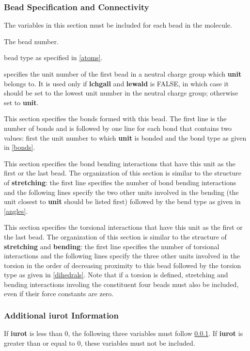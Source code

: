 \documentclass[12pt,letterpaper]{article}
\begin{document}
\subsubsection{Bead Specification and Connectivity}
\label{beadspec}
The variables in this section must be included for each bead
in the molecule.

 The bead number.

 bead type as specified in \ref{atoms}.

 specifies the unit number of the
first bead in a neutral charge group which {\bf unit}
belongs to. It is used only if {\bf lchgall} and {\bf
  lewald} is FALSE, in which case it should be set to the
lowest unit number in the neutral charge group; otherwise
set to {\bf unit}.

 This section specifies the bonds
formed with this bead. The first line is the number of bonds
and is followed by one line for each bond that contains two
values: first the unit number to which {\bf unit} is bonded
and the bond type as given in \ref{bonds}.

 This section specifies the bond
bending interactions that have this unit as the first or the
last bead. The organization of this section is similar to
the structure of {\bf stretching}: the first line specifies
the number of bond bending interactions and the following
lines specify the two other units involved in the bending
(the unit closest to {\bf unit} should be listed first)
followed by the bend type as given in \ref{angles}.

 This section specifies the torsional
interactions that have this unit as the first or the last
bead. The organization of this section is similar to the
structure of {\bf stretching} and {\bf bending}: the first
line specifies the number of torsional interactions and the
following lines specify the three other units involved in
the torsion in the order of decreasing proximity to this
bead followed by the torsion type as given in
\ref{dihedrals}. Note that if a torsion is defined,
stretching and bending interactions involing the constituent
four beads must also be included, even if their force
constants are zero.

\subsubsection{Additional {\bf iurot} Information}
If {\bf iurot} is less than 0, the following three variables
must follow \ref{beadspec}. If {\bf iurot} is greater than
or equal to 0, these variables must not be included.
\end{document}
